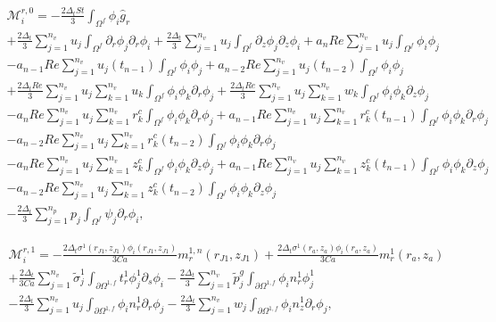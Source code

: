 \documentclass{article}
\begin{document}
\begin{equation}
\begin{array}{l} \mathcal{M}_i^{r,0} = -\frac{2\Delta_t St}{3} \int_{\Omega^f} \phi_i \hat{g}_r \\ + \frac{2\Delta_t}{3} \sum_{j=1}^{n_v} u_j \int_{\Omega^f} \partial_r \phi_j \partial_r \phi_i + \frac{2\Delta_t}{3} \sum_{j=1}^{n_v} u_j \int_{\Omega^f} \partial_z \phi_j \partial_z \phi_i + a_n Re \sum_{j=1}^{n_v} u_j \int_{\Omega^f} \phi_i \phi_j \\ - a_{n-1} Re \sum_{j=1}^{n_v} u_j(t_{n-1}) \int_{\Omega^f} \phi_i \phi_j + a_{n-2} Re \sum_{j=1}^{n_v} u_j(t_{n-2}) \int_{\Omega^f} \phi_i \phi_j \\ + \frac{2\Delta_t Re}{3} \sum_{j=1}^{n_v} u_j \sum_{k=1}^{n_v} u_k \int_{\Omega^f} \phi_i \phi_k \partial_r \phi_j + \frac{2\Delta_t Re}{3} \sum_{j=1}^{n_v} u_j \sum_{k=1}^{n_v} w_k \int_{\Omega^f} \phi_i \phi_k \partial_z \phi_j \\ - a_n Re \sum_{j=1}^{n_v} u_j \sum_{k=1}^{n_v} r_k^c \int_{\Omega^f} \phi_i \phi_k \partial_r \phi_j + a_{n-1} Re \sum_{j=1}^{n_v} u_j \sum_{k=1}^{n_v} r_k^c(t_{n-1}) \int_{\Omega^f} \phi_i \phi_k \partial_r \phi_j \\ - a_{n-2} Re \sum_{j=1}^{n_v} u_j \sum_{k=1}^{n_v} r_k^c(t_{n-2}) \int_{\Omega^f} \phi_i \phi_k \partial_r \phi_j \\ - a_n Re \sum_{j=1}^{n_v} u_j \sum_{k=1}^{n_v} z_k^c \int_{\Omega^f} \phi_i \phi_k \partial_z \phi_j + a_{n-1} Re \sum_{j=1}^{n_v} u_j \sum_{k=1}^{n_v} z_k^c(t_{n-1}) \int_{\Omega^f} \phi_i \phi_k \partial_z \phi_j \\ - a_{n-2} Re \sum_{j=1}^{n_v} u_j \sum_{k=1}^{n_v} z_k^c(t_{n-2}) \int_{\Omega^f} \phi_i \phi_k \partial_z \phi_j \\ - \frac{2\Delta_t}{3} \sum_{j=1}^{n_p} p_j \int_{\Omega^f} \psi_j \partial_r \phi_i, \end{array} \tag{4.92}
\end{equation}

\begin{equation}
\begin{array}{l} \mathcal{M}_i^{r,1} = -\frac{2\Delta_t \sigma^1(r_{J1},z_{J1})\phi_i(r_{J1},z_{J1})}{3Ca} m_r^{1,n}(r_{J1},z_{J1}) + \frac{2\Delta_t \sigma^1(r_a,z_a)\phi_i(r_a,z_a)}{3Ca} m_r^{1}(r_a,z_a) \\ + \frac{2\Delta_t}{3Ca} \sum_{j=1}^{n_v} \tilde{\sigma}_j^1 \int_{\partial \Omega^{1,f}} t_r^1 \phi_j^1 \partial_s \phi_i - \frac{2\Delta_t}{3} \sum_{j=1}^{n_v} \tilde{p}_j^g \int_{\partial \Omega^{1,f}} \phi_i n_r^1 \phi_j^1 \\ - \frac{2\Delta_t}{3} \sum_{j=1}^{n_v} u_j \int_{\partial \Omega^{1,f}} \phi_i n_r^1 \partial_r \phi_j - \frac{2\Delta_t}{3} \sum_{j=1}^{n_v} w_j \int_{\partial \Omega^{1,f}} \phi_i n_z^1 \partial_r \phi_j, \end{array} \tag{4.93}
\end{equation}
\end{document}
